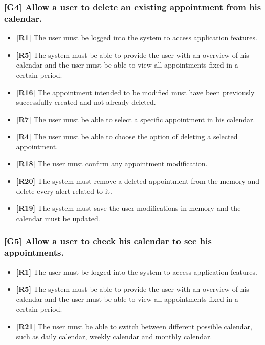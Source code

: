\subsubsection{[G4] Allow a user to delete an existing appointment from his calendar.}
\begin{itemize}
	\item \textbf{[R1]} The user must be logged into the system to access application features.
	\item \textbf{[R5]} The system must be able to provide the user with an overview of his calendar and the user must be able to view all appointments fixed in a certain period.
	\item \textbf{[R16]} The appointment intended to be modified must have been previously successfully created and not already deleted.
	\item \textbf{[R7]} The user must be able to select a specific appointment in his calendar.
	\item \textbf{[R4]} The user must be able to choose the option of deleting a selected appointment.
	\item \textbf{[R18]} The user must confirm any appointment modification.
	\item \textbf{[R20]} The system must remove a deleted appointment from the memory and delete every alert related to it.
	\item \textbf{[R19]} The system must save the user modifications in memory and the calendar must be updated.	
\end{itemize}

\subsubsection{[G5] Allow a user to check his calendar to see his appointments.}
\begin{itemize}
	\item \textbf{[R1]} The user must be logged into the system to access application features. 
	\item \textbf{[R5]} The system must be able to provide the user with an overview of his calendar and the user must be able to view all appointments fixed in a certain period.
	\item \textbf{[R21]} The user must be able to switch between different possible calendar, such as daily calendar, weekly calendar and monthly calendar.
\end{itemize}


